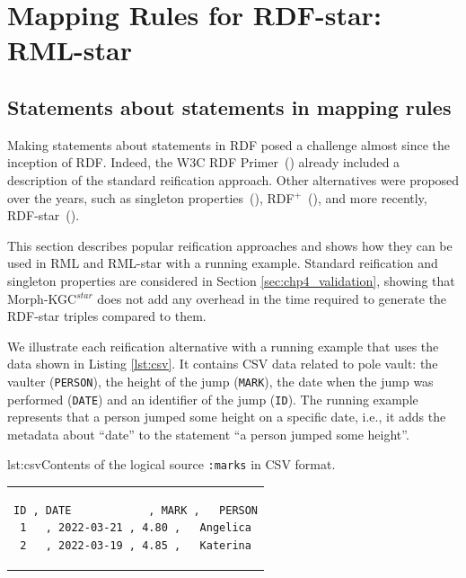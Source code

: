 \section{Mapping Rules for RDF-star: RML-star}
\label{sec:chp4_rml_star}


\subsection{Statements about statements in mapping rules}
\label{sec:chp4_reif_mappings}

Making statements about statements in RDF
posed a challenge almost since the inception of RDF.
Indeed, the W3C RDF Primer~(\cite{manola2004rdf}) already included a description of the standard reification approach.
Other alternatives were proposed over the years,
such as singleton properties~(\cite{nguyen2014don}), RDF$^+$~(\cite{schueler2008querying}), and more recently, \mbox{RDF-star}~(\cite{hartig2017foundations}). 

This section describes popular reification approaches and shows how they can be used in RML and RML-star with a running example. 
Standard reification and singleton properties are considered in Section \ref{sec:chp4_validation}, showing that
\mbox{Morph-KGC$^{star}$} does not add any overhead in the time required to generate the \mbox{RDF-star} 
triples compared to them.

We illustrate each reification alternative with a running example that uses the data shown in Listing \ref{lst:csv}.
It contains CSV data related to pole vault:
the vaulter (\texttt{PERSON}),
the height of the jump (\texttt{MARK}),
the date when the jump was performed (\texttt{DATE}) and
an identifier of the jump (\texttt{ID}).
The running example represents
that a person jumped some height on a specific date, i.e., it adds the metadata about ``date''
to the statement ``a person jumped some height''.

\noindent\hspace{0.19\linewidth}\begin{minipage}{\linewidth}
\begin{captionedlisting}{lst:csv}{Contents of the logical source \texttt{:marks} in CSV format.}
\centering
\begin{tabular}{c}
\hspace{3em}
{\begin{lstlisting}[basicstyle=\ttfamily\small,label={list:example1},columns=flexible]
ID , DATE            , MARK ,   PERSON
1   , 2022-03-21 , 4.80 ,   Angelica
2   , 2022-03-19 , 4.85 ,   Katerina
\end{lstlisting}}
\end{tabular}
\end{captionedlisting}
\end{minipage}

